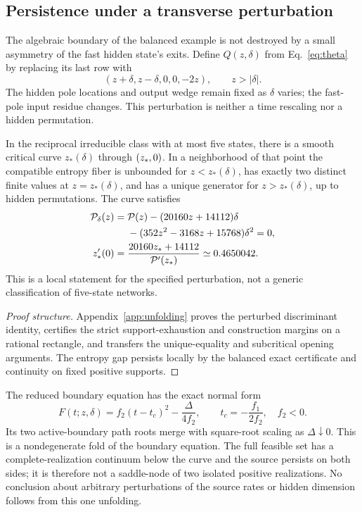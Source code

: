 \subsection{Persistence under a transverse perturbation}\label{sec:unfolding}
The algebraic boundary of the balanced example is not destroyed by a small
asymmetry of the fast hidden state's exits.  Define $Q(z,\delta)$ from
Eq.~\eqref{eq:theta} by replacing its last row with
\begin{equation}
 (z+\delta,z-\delta,0,0,-2z),\qquad z>|\delta|.
\end{equation}
The hidden pole locations and output wedge remain fixed as $\delta$ varies;
the fast-pole input residue changes.  This perturbation is neither a time
rescaling nor a hidden permutation.

\begin{proposition}\label{prop:unfolding}
In the reciprocal irreducible class with at most five states, there is a
smooth critical curve $z_*(\delta)$ through $(z_*,0)$.  In a neighborhood of
that point the compatible entropy fiber is unbounded for $z<z_*(\delta)$,
has exactly two distinct finite values at $z=z_*(\delta)$, and has a unique
generator for $z>z_*(\delta)$, up to hidden permutations.  The curve satisfies
\begin{align}
 \mathcal P_\delta(z)={}&\mathcal P(z)-(20160z+14112)\delta\nonumber\\
 &-(352z^2-3168z+15768)\delta^2=0,\label{eq:perturbedP}\\
 z_*'(0)={}&\frac{20160z_*+14112}{\mathcal P'(z_*)}
 \simeq0.4650042.\label{eq:perturbedslope}
\end{align}
This is a local statement for the specified perturbation, not a generic
classification of five-state networks.
\end{proposition}

\begin{proof}[Proof structure] Appendix~\ref{app:unfolding} proves the perturbed discriminant identity, certifies the strict support-exhaustion and construction margins on a rational rectangle, and transfers the unique-equality and subcritical opening arguments. The entropy gap persists locally by the balanced exact certificate and continuity on fixed positive supports.\end{proof}



The reduced boundary equation has the exact normal form
\begin{equation}
 F(t;z,\delta)=f_2(t-t_c)^2-\frac{\Delta}{4f_2},
 \qquad t_c=-\frac{f_1}{2f_2},\quad f_2<0.\label{eq:foldnormal}
\end{equation}
Its two active-boundary path roots merge with square-root scaling as
$\Delta\downarrow0$.  This is a nondegenerate fold of the boundary
equation.  The full feasible set has a complete-realization continuum
below the curve and the source persists on both sides; it is therefore
not a saddle-node of two isolated positive realizations.  No conclusion
about arbitrary perturbations of the source rates or hidden dimension
follows from this one unfolding.

